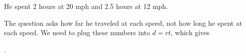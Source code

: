 \documentclass[letterpaper, landscape]{exam}
\begin{document}
\begin{description}
      He spent 2 hours at 20 mph and 2.5 hours at 12 mph.  

      The question asks how far he traveled at each speed, not how long he spent at each speed.  We need to plug these
      numbers into $d = rt$, which gives 
      
      .  

  \end{description}
  \fi
\end{document}
